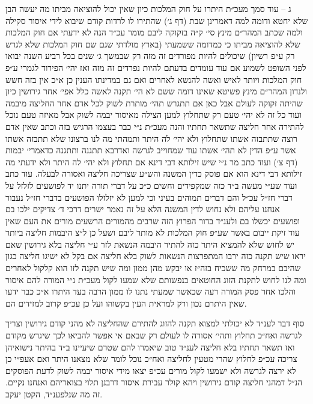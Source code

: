 \documentclass[12pt, openany]{book}
\begin{document}
\begin{multicols}{2}
ג – עוד סמך מעכ״ת היתרו על חוק המלכות כיון שאין יכול להוציאה מביתו מה יעשה הבן שלא יחטא ודומה למה דאמרינן שבת (דף ג׳) שהתירו לו לרדות קודם שיבוא לידי איסור סקילה ולמה שכתב המהר״ם מינץ סי׳ ק״ה בזקוקה ליבם מומר עכ״ד הנה לא ידעתי אם חוק המלכות שלא להוציאה מביתו כי כמדומה ששמעתי (בארץ מולדתי שגם שם חוק המלכות שלא לגרש רק ע״פ רשיון) שיכולים להיות מפורדים זה מזה רק שבמשך ג׳ שנים בכל רביע השנה יבואו לפני השופט לשמוע אם עוד עומדים בדעתם להיות נפרדים זה מזה ואז יהי׳ הפירוד לגמרי ע״פ חוק המלכות ויותר לאיש ואשה להנשא לאחרים ואם גם במדינתו הענין כן א״כ אין בזה חשש ולנדון המהר״ם מינץ פשיטא שאינו דומה ששם לא הי׳ תקנה לאשה כלל אפי׳ אחר גירושין כיון שהיתה זקוקה לעולם אבל כאן אם תתגרש תהי׳ מותרת לשוק לכל אדם אחר החליצה מיבמה ועוד כל זה לא יהי׳ טעם רק שתחלוץ למען הצילה מאיסור יבמה לשוק אבל מאיזה טעם נוכל להתירה אחר חליצה שתשאר תחתיו והנה מעכ״ת נ״י כבר בעצמו הרגיש בזה וכתב שאין אדם רוצה שתתבזה אשתו שתחלוץ ולא יהי׳ לה היתר ותמהתי מה לנו ברצונו שלא תתבזה אשתו אשר ע״פ הדין לא תהי׳ אשתו עוד שמחוייב לגרשה ואדרבא תתגנה ותתגנה כדאמרי׳ יבמות (דף צ׳) ועוד כתב מר נ״י שיש זילותא דבי דינא אם תחלוץ ולא יהי׳ לה היתר ולא ידעתי מה זילותא דבי דינא הוא אם פוסק כדין המשנה והש״ע שצריכה חליצה ואסורה לבעלה. עוד כתב ועוד שע״י מעשה ב״ד כזה שמקפידים וחשים כ״כ על דברי תורה יתנו יד לפושעים לזלזל על דברי חז״ל עכ״ל והם דברים תמוהים בעיני וכי למען לא יזלזלו הפושעים בדברי חז״ל נעבור אנחנו עליהם ולא נחוש לדין המשנה הלא על זה נאמר ישרים דרכי ד׳ צדיקים ילכו בם ופושעים יכשלו בם ולענ״ד בדור הפרוץ הזה שרבים מהמורים הרשעים מורים את העם שאין עוד זיקת ייבום באשר שע״פ חוק המלכות לא מותר ליבם ושעל כן ל״צ היבמות חליצה ביותר יש לחוש שלא להמציא היתר כזה להתיר היבמה הנשאת לזר ע״י חליצה בלא גירושין שאם יראו שיש תקנה כזה ירבו המתפרצות הנשאות לשוק בלא חליצה אם בקל לא ישיגו חליצה כגון שהיבם במרחק מה ששכיח בזה״ז או יבקש מהן ממון ומה שיש תקנה לזו הוא קלקול לאחרים ומה לנו לחוש לתקנת הזוג החוטאים בנפשותם שלא שמעו לקול מעכ״ת נ״י המורה להם איסור והלכו אחר פסק המורה רעה שכאשר שמעתי נתנו לו ממון הרבה בעד היתרו א״כ כבר ידעו שאין היתרם נכון ורק למראית העין בקשוהו ועל כן עכ״פ קרוב למזידים הם.\\\vspace{0pt}

סוף דבר לענ״ד לא יכולתי למצוא תקנה להזוג להתירם שהחליצה לא מהני קודם גירושין וצריך לגרשה ואח״כ תחלוץ ותהי׳ אסורה לו לעולם רק שבאם אי אפשר להביאו לכך שיגרש מקודם ואז תשאר תחתיו בלא חליצה לענ״ד טוב שיאמרו להם שטרם שיעיינו ב״ד בהיתר נישואיהן צריכה עכ״פ לחלוץ שהרי מטעין לחליצה ואח״כ נוכל לומר שלא מצאנו היתר ואם אעפ״י כן לא ירצה לגרשה ולא ישמעו לקול מורים עכ״פ יצאו מידי איסור יבמה לשוק לדעת הפוסקים הנ״ל דמהני חליצה קודם גירושין ויהא קולר עבירת איסור דרבנן תלוי בצואריהם ואנחנו נקיים. זה מה שנלפענ״ד, הקטן יעקב.\\\vspace{0pt}

\end{multicols}\newpage
\end{document}
